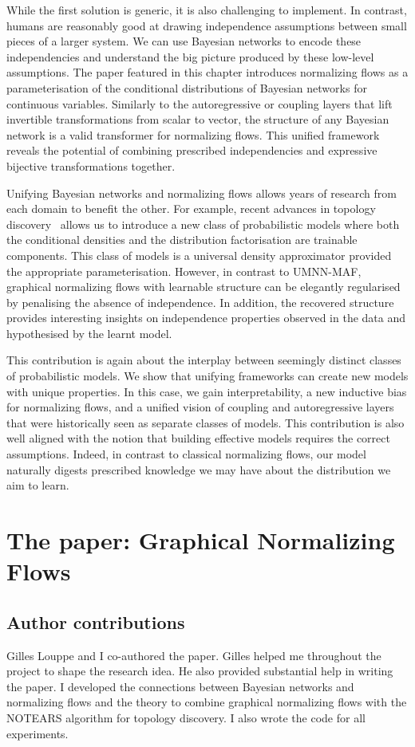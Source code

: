 While the first solution is generic, it is also challenging to implement. In contrast, humans are reasonably good at drawing independence assumptions between small pieces of a larger system. We can use Bayesian networks to encode these independencies and understand the big picture produced by these low-level assumptions. The paper featured in this chapter introduces normalizing flows as a parameterisation of the conditional distributions of Bayesian networks for continuous variables. Similarly to the autoregressive or coupling layers that lift invertible transformations from scalar to vector, the structure of any Bayesian network is a valid transformer for normalizing flows. This unified framework reveals the potential of combining prescribed independencies and expressive bijective transformations together.

Unifying Bayesian networks and normalizing flows allows years of research from each domain to benefit the other. For example, recent advances in topology discovery~\citep{zheng2018dags} allows us to introduce a new class of probabilistic models where both the conditional densities and the distribution factorisation are trainable components. This class of models is a universal density approximator provided the appropriate parameterisation. However, in contrast to UMNN-MAF, graphical normalizing flows with learnable structure can be elegantly regularised by penalising the absence of independence. In addition, the recovered structure provides interesting insights on independence properties observed in the data and hypothesised by the learnt model.

This contribution is again about the interplay between seemingly distinct classes of probabilistic models. We show that unifying frameworks can create new models with unique properties. In this case, we gain interpretability, a new inductive bias for normalizing flows, and a unified vision of coupling and autoregressive layers that were historically seen as separate classes of models. This contribution is also well aligned with the notion that building effective models requires the correct assumptions. Indeed, in contrast to classical normalizing flows, our model naturally digests prescribed knowledge we may have about the distribution we aim to learn.


\section{The paper: Graphical Normalizing Flows}
\subsection{Author contributions}
Gilles Louppe and I co-authored the paper. Gilles helped me throughout the project to shape the research idea. He also provided substantial help in writing the paper. I developed the connections between Bayesian networks and normalizing flows and the theory to combine graphical normalizing flows with the NOTEARS algorithm for topology discovery. I also wrote the code for all experiments.

